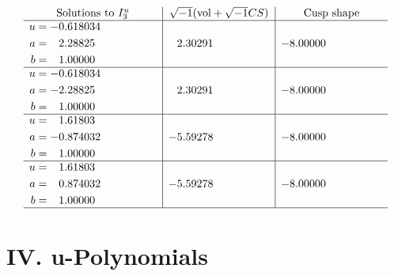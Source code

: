 \documentclass[1p]{elsarticle_modified}
\theoremstyle{definition}
\newcommand{\I}{\sqrt{-1}}
\begin{document}
$$\begin{array}{c|c|c}  
\text{Solutions to }I^u_{3}& \I (\text{vol} + \sqrt{-1}CS) & \text{Cusp shape}\\
 \hline 
\begin{aligned}
u &= -0.618034\phantom{ +0.000000I} \\
a &= \phantom{-}2.28825\phantom{ +0.000000I} \\
b &= \phantom{-}1.00000\phantom{ +0.000000I}\end{aligned}
 & \phantom{-}2.30291\phantom{ +0.000000I} & -8.00000\phantom{ +0.000000I} \\ \hline\begin{aligned}
u &= -0.618034\phantom{ +0.000000I} \\
a &= -2.28825\phantom{ +0.000000I} \\
b &= \phantom{-}1.00000\phantom{ +0.000000I}\end{aligned}
 & \phantom{-}2.30291\phantom{ +0.000000I} & -8.00000\phantom{ +0.000000I} \\ \hline\begin{aligned}
u &= \phantom{-}1.61803\phantom{ +0.000000I} \\
a &= -0.874032\phantom{ +0.000000I} \\
b &= \phantom{-}1.00000\phantom{ +0.000000I}\end{aligned}
 & -5.59278\phantom{ +0.000000I} & -8.00000\phantom{ +0.000000I} \\ \hline\begin{aligned}
u &= \phantom{-}1.61803\phantom{ +0.000000I} \\
a &= \phantom{-}0.874032\phantom{ +0.000000I} \\
b &= \phantom{-}1.00000\phantom{ +0.000000I}\end{aligned}
 & -5.59278\phantom{ +0.000000I} & -8.00000\phantom{ +0.000000I}\\
 \hline 
 \end{array}$$\newpage
\newpage\renewcommand{\arraystretch}{1}
\centering \section*{ IV. u-Polynomials}
\end{document}
